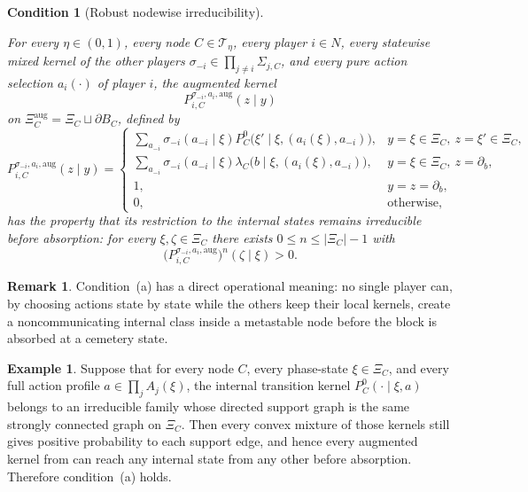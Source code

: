 \documentclass[12pt]{article}
\newtheorem{condition}[theorem]{Condition}
\theoremstyle{definition}
\newtheorem{remark}[theorem]{Remark}
\newtheorem{example}[theorem]{Example}
\newcommand{\1}{\mathbf{1}}
\newcommand{\cT}{\mathcal{T}}
\begin{document}
\begin{condition}[Robust nodewise irreducibility]
\label{cond:a}

For every $\eta\in(0,1)$, every node $C\in\cT_\eta$, every player $i\in N$, every
statewise mixed kernel of the other players
$\sigma_{-i}\in\prod_{j\ne i}\Sigma_{j,C}$, and every pure action selection
$a_i(\cdot)$ of player $i$, the augmented kernel
\[
P_{i,C}^{\sigma_{-i},a_i,\mathrm{aug}}(z\mid y)
\]
on $\Xi_C^{\mathrm{aug}}=\Xi_C\sqcup\partial B_C$, defined by
\[
P_{i,C}^{\sigma_{-i},a_i,\mathrm{aug}}(z\mid y)
=
\begin{cases}
\displaystyle
\sum_{a_{-i}}\sigma_{-i}(a_{-i}\mid\xi)
P_C^0\bigl(\xi'\mid\xi,(a_i(\xi),a_{-i})\bigr),
& y=\xi\in\Xi_C,\ z=\xi'\in\Xi_C,\\[0.7em]
\displaystyle
\sum_{a_{-i}}\sigma_{-i}(a_{-i}\mid\xi)
\lambda_C\bigl(b\mid\xi,(a_i(\xi),a_{-i})\bigr),
& y=\xi\in\Xi_C,\ z=\partial_b,\\[0.7em]
1, & y=z=\partial_b,\\
0, & \text{otherwise,}
\end{cases}
\]
has the property that its restriction to the internal states remains irreducible
before absorption: for every $\xi,\zeta\in\Xi_C$ there exists
$0\le n\le |\Xi_C|-1$ with
\[
\bigl(P_{i,C}^{\sigma_{-i},a_i,\mathrm{aug}}\bigr)^n(\zeta\mid\xi)>0.
\]
\end{condition}

\begin{remark}
Condition~\textnormal{(a)} has a direct operational meaning: no single player can,
by choosing actions state by state while the others keep their local kernels,
create a noncommunicating internal class inside a metastable node before the block
is absorbed at a cemetery state.
\end{remark}

\begin{example}
\label{ex:cond-a-trivial}
Suppose that for every node $C$, every phase-state $\xi\in\Xi_C$, and every full
action profile $a\in\prod_j A_j(\xi)$, the internal transition kernel
$P_C^0(\cdot\mid\xi,a)$ belongs to an irreducible family whose directed support
graph is the same strongly connected graph on $\Xi_C$. Then every convex mixture
of those kernels still gives positive probability to each support edge, and hence
every augmented kernel from  can reach any internal state from any
other before absorption. Therefore condition~\textnormal{(a)} holds.
\end{example}
\end{document}
